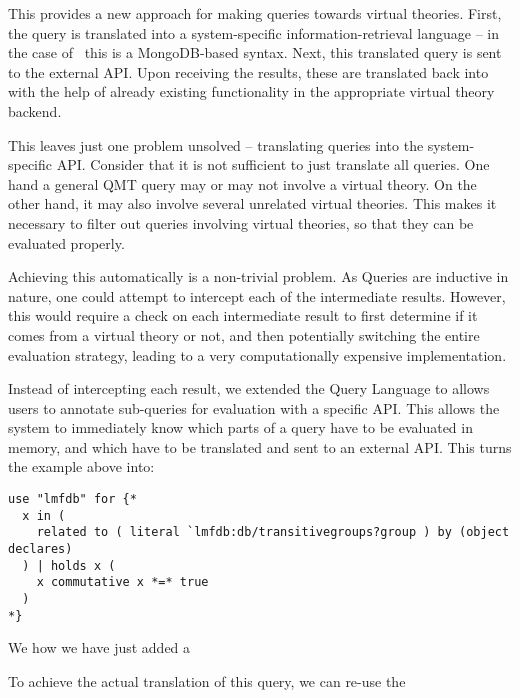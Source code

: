 This provides a new approach for making queries towards virtual theories. 
First, the \mmt query is translated into a system-specific information-retrieval language -- in the case of \lmfdb\ this is a MongoDB-based syntax.
Next, this translated query is sent to the external API. 
Upon receiving the results, these are translated back into \ommt with the help of already existing functionality in the appropriate virtual theory backend.

This leaves just one problem unsolved -- translating queries into the system-specific API. 
Consider that it is not sufficient to just translate all queries. 
One hand a general QMT query may or may not involve a virtual theory. 
On the other hand, it may also involve several unrelated virtual theories. 
This makes it necessary to filter out queries involving virtual theories, so that they can be evaluated properly. 

Achieving this automatically is a non-trivial problem. 
As Queries are inductive in nature, one could attempt to intercept each of the intermediate results. 
However, this would require a check on each intermediate result to first determine if it comes from a virtual theory or not, and then potentially switching the entire evaluation strategy, leading to a very computationally expensive implementation. 

Instead of intercepting each result, we extended the Query Language to allows users to annotate sub-queries for evaluation with a specific API. 
This allows the system to immediately know which parts of a query have to be evaluated in \mmt memory, and which have to be translated and sent to an external API. 
This turns the example above into:
\begin{lstlisting}[language=qmt]
use "lmfdb" for {*
  x in (
    related to ( literal `lmfdb:db/transitivegroups?group ) by (object declares)
  ) | holds x (
    x commutative x *=* true
  )
*}
\end{lstlisting}
We how we have just added a 

To achieve the actual translation of this query, we can re-use the 
